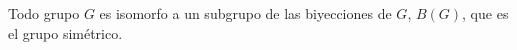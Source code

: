 \begin{thm}
    Todo grupo $G$ es isomorfo a un subgrupo de las biyecciones de $G$, $B(G)$, que es el grupo simétrico.
\end{thm}
